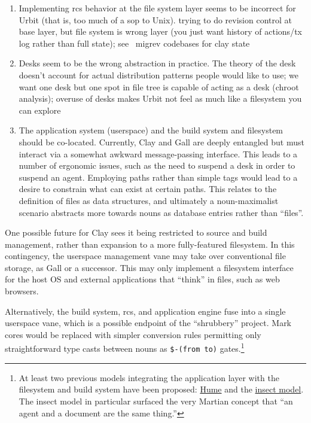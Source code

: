\documentclass[twoside]{article}
\begin{document}
\begin{enumerate}
  \item  Implementing {\sc rcs} behavior at the file system layer seems to be incorrect for Urbit (that is, too much of a sop to Unix).  trying to do revision control at base layer, but file system is wrong layer (you just want history of actions/tx log rather than full state); see ~migrev codebases for clay state
  \item  Desks seem to be the wrong abstraction in practice.  The theory of the desk doesn't account for actual distribution patterns people would like to use; we want one desk but one spot in file tree is capable of acting as a desk (chroot analysis); overuse of desks makes Urbit not feel as much like a filesystem you can explore
  \item  The application system (userspace) and the build system and filesystem should be co-located.  Currently, Clay and Gall are deeply entangled but must interact via a somewhat awkward message-passing interface.  This leads to a number of ergonomic issues, such as the need to suspend a desk in order to suspend an agent.  Employing paths rather than simple tags would lead to a desire to constrain what can exist at certain paths.  This relates to the definition of files as data structures, and ultimately a noun-maximalist scenario abstracts more towards nouns as database entries rather than ``files''.
\end{enumerate}

One possible future for Clay sees it being restricted to source and build management, rather than expansion to a more fully-featured filesystem.  In this contingency, the userspace management vane may take over conventional file storage, as Gall or a successor.  This may only implement a filesystem interface for the host OS and external applications that ``think'' in files, such as web browsers.

Alternatively, the build system, {\sc rcs}, and application engine fuse into a single userspace vane, which is a possible endpoint of the ``shrubbery'' project.  Mark cores would be replaced with simpler conversion rules permitting only straightforward type casts between nouns as \lstinline[style=inlinecode]{$-(from to)} gates.\footnote{At least two previous models integrating the application layer with the filesystem and build system have been proposed:  \href{https://gist.github.com/arthyn/0476d2f4e9912aa46746c3dd3cd20d15}{Hume} and the \href{https://gist.github.com/arthyn/f805f8294791adccbdb6e0454defb67a}{insect model}.  The insect model in particular surfaced the very Martian concept that ``an agent and a document are the same thing.''}
\end{document}
